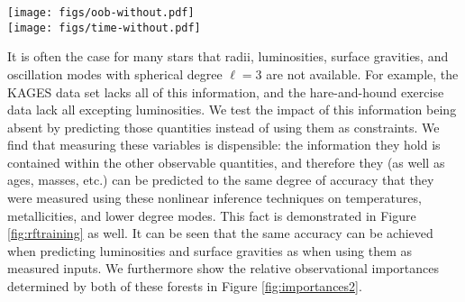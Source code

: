 \documentclass[manuscript]{aastex}
\begin{document}
\begin{figure*}
    \centering
    \texttt{[image: figs/oob-without.pdf]}\\
    \texttt{[image: figs/time-without.pdf]}\\
    \caption{Training accuracies (top) and times (bottom) of a random forest regressor plotted as a function of the number of trees in the forest. In less than one minute's time and using only a small number of trees, a machine learning algorithm can determine the relations that permit inference of stellar parameters from observations. It can also be seen that the training time is linear in the amount of decision trees used to fit the data. After the forest has about 16 trees, a regressor using a limited set of information (blue and red) does just as well as the regressor using all of the information (black). The performance of the regressor does not improve much after having grown about 32 trees. }
    \label{fig:rftraining}
\end{figure*}

It is often the case for many stars that radii, luminosities, surface gravities, and oscillation modes with spherical degree $\ell=3$ are not available. For example, the KAGES data set lacks all of this information, and the hare-and-hound exercise data lack all excepting luminosities. We test the impact of this information being absent by predicting those quantities instead of using them as constraints. We find that measuring these variables is dispensible: the information they hold is contained within the other observable quantities, and therefore they (as well as ages, masses, etc.) can be predicted to the same degree of accuracy that they were measured using these nonlinear inference techniques on temperatures, metallicities, and lower degree modes. This fact is demonstrated in Figure \ref{fig:rftraining} as well. It can be seen that the same accuracy can be achieved when predicting luminosities and surface gravities as when using them as measured inputs. We furthermore show the relative observational importances determined by both of these forests in Figure \ref{fig:importances2}. 
\end{document}

